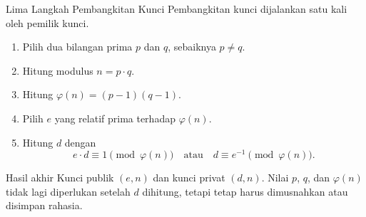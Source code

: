 \documentclass[aspectratio=169,11pt]{beamer}
\begin{document}
\begin{frame}{Lima Langkah Pembangkitan Kunci}
    \footnotesize
    Pembangkitan kunci dijalankan satu kali oleh pemilik kunci.
    \begin{enumerate}
        \item Pilih dua bilangan prima $p$ dan $q$, sebaiknya $p \neq q$.
        \item Hitung modulus $n = p \cdot q$.
        \item Hitung $\varphi(n) = (p-1)(q-1)$.
        \item Pilih $e$ yang relatif prima terhadap $\varphi(n)$.
        \item Hitung $d$ dengan
              \[
                  e \cdot d \equiv 1 \pmod{\varphi(n)}
                  \quad \text{atau} \quad
                  d \equiv e^{-1} \pmod{\varphi(n)} .
              \]
    \end{enumerate}
    \begin{block}{Hasil akhir}
        \footnotesize
        Kunci publik $(e,n)$ dan kunci privat $(d,n)$. Nilai $p$, $q$, dan
        $\varphi(n)$ tidak lagi diperlukan setelah $d$ dihitung, tetapi
        tetap harus dimusnahkan atau disimpan rahasia.
    \end{block}
\end{frame}
\end{document}
